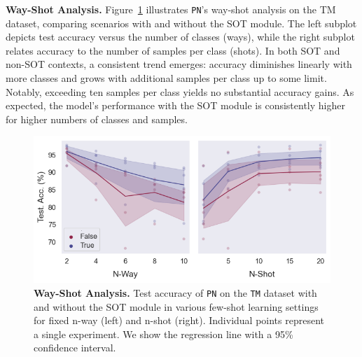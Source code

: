 \textbf{Way-Shot Analysis.} Figure~\ref{fig:way-shot} illustrates \texttt{PN}'s way-shot analysis on the TM dataset, comparing scenarios with and without the SOT module. The left subplot depicts test accuracy versus the number of classes (ways), while the right subplot relates accuracy to the number of samples per class (shots). In both SOT and non-SOT contexts, a consistent trend emerges: accuracy diminishes linearly with more classes and grows with additional samples per class up to some limit. Notably, exceeding ten samples per class yields no substantial accuracy gains. As expected, the model's performance with the SOT module is consistently higher for higher numbers of classes and samples.

\begin{figure}[h!]
    \centering
    \includegraphics[width=1\columnwidth]{figures/way-shot.png}
    \caption{\textbf{Way-Shot Analysis.} Test accuracy of \texttt{PN} on the \texttt{TM} dataset with and without the SOT module in various 
    few-shot learning settings for fixed n-way (left) and n-shot (right). Individual points represent a single experiment. We show the regression line with a 95\% confidence interval.}
    \label{fig:way-shot}
\end{figure}
